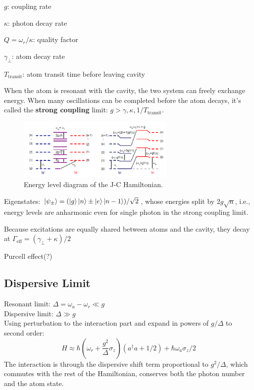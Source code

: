 \documentclass[8pt,a4paper,twocolumn]{article} %
\numberwithin{equation}{section} %
\begin{document}
		$g $: coupling rate

		$\kappa $: photon decay rate

		$ Q=\omega_r/\kappa $: quality factor

		$ \gamma_{\perp} $: atom decay rate

		$T_{\text{transit}}$: atom transit time before leaving cavity

		When the atom is resonant with the cavity, the two system can freely exchange energy. When many oscillations can be completed before the atom decays, it's called the \textbf{strong coupling} limit: $g>\gamma,\kappa,1/T_{\text{transit}} $.

		\begin{figure}[!h]
			\centering
			\includegraphics[width=3in]{JClevels.png}
			\caption{Energy level diagram of the J-C Hamiltonian. \cite{Schuster2007}}
			\label{pic:JClevels}
		\end{figure}

		Eigenstates: $ \ket{\psi_{\pm} } = ( \ket g \ket n \pm \ket e \ket{n-1} )/\sqrt 2 $, whose energies split by $2g\sqrt n$, i.e., energy levels are anharmonic even for single photon in the strong coupling limit.

		Because excitations are equally shared between atoms and the cavity, they decay at $\Gamma_{\text{eff} }=(\gamma_{\perp}+\kappa)/2 $

		Purcell effect(?)

		\subsection{Dispersive Limit} %
		\label{sub:dispersive_limit}
			Resonant limit: $\Delta=\omega_a- \omega_r \ll g $\\
			Dispersive limit: $\Delta\gg g$\\
			Using perturbation to the interaction part and expand in powers of $g/\Delta $ to second order:
			\begin{equation}
				H\approx \hbar \left( \omega_r +\frac{g^2}{\Delta} \sigma_z \right) (a^{\dagger}a+1/2)+\hbar \omega_a \sigma_z /2
			\end{equation}
			The interaction is through the dispersive shift term proportional to $g^2/\Delta$, which commutes with the rest of the Hamiltonian, conserves both the photon number and the atom state.
\end{document}
